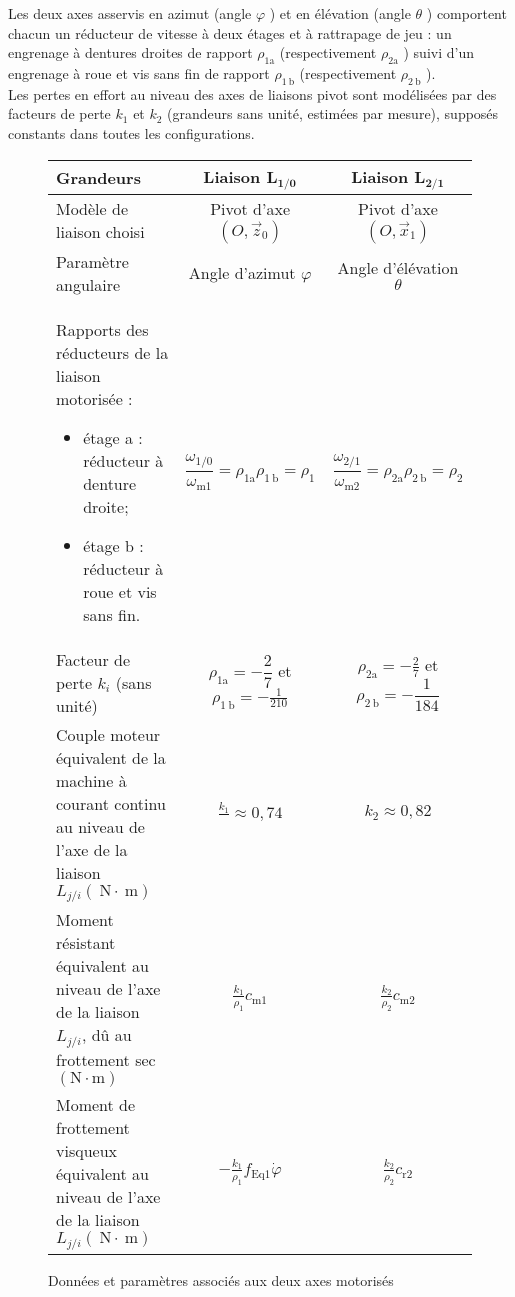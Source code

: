 Les deux axes asservis en azimut (angle $\varphi$ ) et en élévation (angle $\theta$ ) comportent chacun un réducteur de vitesse à deux étages et à rattrapage de jeu : un engrenage à dentures droites de rapport $\rho_{1 \mathrm{a}}$ (respectivement $\rho_{2 \mathrm{a}}$ ) suivi d'un engrenage à roue et vis sans fin de rapport $\rho_{1 \mathrm{~b}}$ (respectivement $\rho_{2 \mathrm{~b}}$ ).\\
Les pertes en effort au niveau des axes de liaisons pivot sont modélisées par des facteurs de perte $k_{1}$ et $k_{2}$ (grandeurs sans unité, estimées par mesure), supposés constants dans toutes les configurations.

\begin{figure}[!h]
\centering
\begin{tabular}{|p{8cm}|c|c|}
\hline
Grandeurs & Liaison $\boldsymbol{L}_{\mathbf{1 / 0}}$ & Liaison $\boldsymbol{L}_{\mathbf{2} / \mathbf{1}}$ \\
\hline
Modèle de liaison choisi & Pivot d'axe $\left(O, \vec{z}_{0}\right)$ & Pivot d'axe $\left(O, \vec{x}_{1}\right)$ \\
\hline
Paramètre angulaire & Angle d'azimut $\varphi$ & Angle d'élévation $\theta$ \\
\hline

Rapports des réducteurs de la liaison motorisée : 
\begin{itemize}
\item étage a : réducteur à denture droite;
\item étage b : réducteur à roue et vis sans fin.
\end{itemize}

 & $\dfrac{\omega_{1 / 0}}{\omega_{\mathrm{m} 1}}=\rho_{1 \mathrm{a}} \rho_{1 \mathrm{~b}}=\rho_{1}$ & $\dfrac{\omega_{2 / 1}}{\omega_{\mathrm{m} 2}}=\rho_{2 \mathrm{a}} \rho_{2 \mathrm{~b}}=\rho_{2}$ \\
\hline
Facteur de perte $k_{i}$ (sans unité) & $\rho_{1 \mathrm{a}}=-\dfrac{2}{7}$ et $\rho_{1 \mathrm{~b}}=-\frac{1}{210}$ & $\rho_{2 \mathrm{a}}=-\frac{2}{7}$ et $\rho_{2 \mathrm{~b}}=-\dfrac{1}{184}$ \\
\hline
Couple moteur équivalent de la machine à courant continu au niveau de l'axe de la liaison $L_{j / i}(\mathrm{~N} \cdot \mathrm{~m})$  & $\frac{k_{1}}{} \approx 0,74$ & $k_{2} \approx 0,82$ \\
\hline
Moment résistant équivalent au niveau de l'axe de 
la liaison $L_{j / i}$, dû au frottement sec $(\mathrm{N} \cdot \mathrm{m})$  & $\frac{k_{1}}{\rho_{1}} c_{\mathrm{m} 1}$ & $\frac{k_{2}}{\rho_{2}} c_{\mathrm{m} 2}$ \\
\hline
Moment de frottement visqueux équivalent au  niveau de l'axe de la liaison $L_{j / i}(\mathrm{~N} \cdot \mathrm{~m})$  & $-\frac{k_{1}}{\rho_{1}} f_{\mathrm{Eq} 1} \dot{\varphi}$ & $\frac{k_{2}}{\rho_{2}} c_{\mathrm{r} 2}$ \\
\hline
\end{tabular}
\caption{Données et paramètres associés aux deux axes motorisés \label{CCS_MP_2017:fig_11}}
\end{figure}


